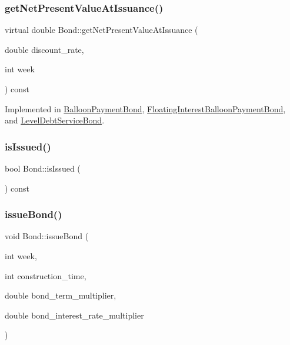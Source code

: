 \subsubsection{\texorpdfstring{get\+Net\+Present\+Value\+At\+Issuance()}{getNetPresentValueAtIssuance()}}
{\footnotesize\ttfamily virtual double Bond\+::get\+Net\+Present\+Value\+At\+Issuance (\begin{DoxyParamCaption}\item[{double}]{discount\+\_\+rate,  }\item[{int}]{week }\end{DoxyParamCaption}) const\hspace{0.3cm}{\ttfamily [pure virtual]}}



Implemented in \mbox{\hyperlink{classBalloonPaymentBond_a11e5aecaf542cfbbb2303e98fb0b93bf}{Balloon\+Payment\+Bond}}, \mbox{\hyperlink{classFloatingInterestBalloonPaymentBond_a90205e26e09eef1227f8c0671ca4fce2}{Floating\+Interest\+Balloon\+Payment\+Bond}}, and \mbox{\hyperlink{classLevelDebtServiceBond_a0f5820c3e76b8b908dbe153a8291d96a}{Level\+Debt\+Service\+Bond}}.

\mbox{\label{classBond_a6342f3dd3295771b71ac1fcc3b666a42}} 
\subsubsection{\texorpdfstring{is\+Issued()}{isIssued()}}
{\footnotesize\ttfamily bool Bond\+::is\+Issued (\begin{DoxyParamCaption}{ }\end{DoxyParamCaption}) const}

\mbox{\label{classBond_a377db8c18b83c4666e46686bc26adef1}} 
\subsubsection{\texorpdfstring{issue\+Bond()}{issueBond()}}
{\footnotesize\ttfamily void Bond\+::issue\+Bond (\begin{DoxyParamCaption}\item[{int}]{week,  }\item[{int}]{construction\+\_\+time,  }\item[{double}]{bond\+\_\+term\+\_\+multiplier,  }\item[{double}]{bond\+\_\+interest\+\_\+rate\+\_\+multiplier }\end{DoxyParamCaption})\hspace{0.3cm}{\ttfamily [virtual]}}


